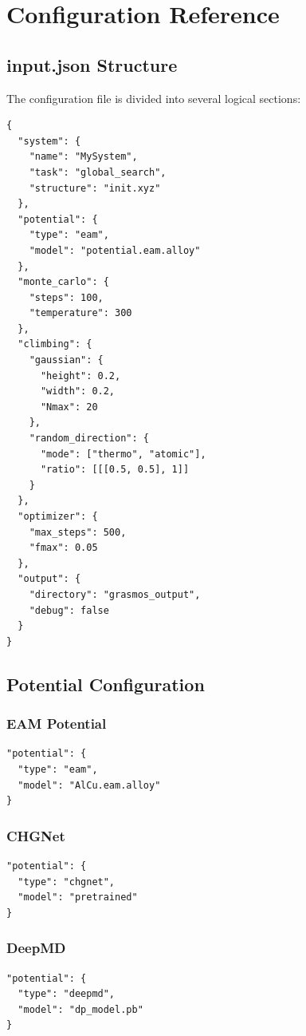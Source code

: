 \documentclass[11pt,a4paper]{article}
\begin{document}
\section{Configuration Reference}

\subsection{input.json Structure}
The configuration file is divided into several logical sections:

\begin{lstlisting}[style=jsonStyle, caption={Minimal input.json example}]
{
  "system": {
    "name": "MySystem",
    "task": "global_search",
    "structure": "init.xyz"
  },
  "potential": {
    "type": "eam",
    "model": "potential.eam.alloy"
  },
  "monte_carlo": {
    "steps": 100,
    "temperature": 300
  },
  "climbing": {
    "gaussian": {
      "height": 0.2,
      "width": 0.2,
      "Nmax": 20
    },
    "random_direction": {
      "mode": ["thermo", "atomic"],
      "ratio": [[[0.5, 0.5], 1]]
    }
  },
  "optimizer": {
    "max_steps": 500,
    "fmax": 0.05
  },
  "output": {
    "directory": "grasmos_output",
    "debug": false
  }
}
\end{lstlisting}

\subsection{Potential Configuration}

\subsubsection{EAM Potential}
\begin{lstlisting}[style=jsonStyle]
"potential": {
  "type": "eam",
  "model": "AlCu.eam.alloy"
}
\end{lstlisting}

\subsubsection{CHGNet}
\begin{lstlisting}[style=jsonStyle]
"potential": {
  "type": "chgnet",
  "model": "pretrained"
}
\end{lstlisting}

\subsubsection{DeepMD}
\begin{lstlisting}[style=jsonStyle]
"potential": {
  "type": "deepmd",
  "model": "dp_model.pb"
}
\end{lstlisting}
\end{document}
